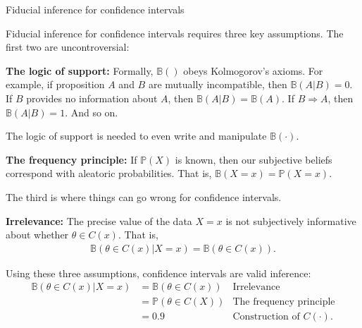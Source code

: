 \documentclass[8pt]{beamer}\usepackage[]{graphicx}\usepackage[]{color}
\def\p#1{\mathbb{P}\left(#1\right)}
\def\b#1{\mathbb{B}\left(#1\right)}
\begin{document}

\begin{frame}{Fiducial inference for confidence intervals}

Fiducial inference for confidence intervals requires three key assumptions.
The first two are uncontroversial:

\textbf{The logic of support:}  Formally, $\b{}$ obeys Kolmogorov's axioms. For
example, if proposition $A$ and $B$ are mutually incompatible, then $\b{A | B} =
0$.  If $B$ provides no information about $A$, then $\b{A | B} = \b{A}$.
If $B \Rightarrow A$, then $\b{A | B} = 1$.  And so on.

The logic of support is needed to even write and manipulate $\b{\cdot}$.

\pause

\textbf{The frequency principle:}  If $\p{X}$ is known, then our
subjective beliefs correspond with aleatoric probabilities.  That is,
$\b{X = x} = \p{X = x}$.

\pause

The third is where things can go wrong for confidence intervals.

\textbf{Irrelevance:} The precise value of the data $X=x$ is not  subjectively
informative about whether $\theta \in C(x)$.  That is,
%
\begin{align*}
%
\b{\theta \in C(x) | X = x} = \b{\theta \in C(x)}.
%
\end{align*}
%

\pause

Using these three assumptions, confidence
intervals are valid inference:
%
\begin{align*}
%
\b{\theta \in C(x) | X = x} &= \b{\theta \in C(x)}
    & \textrm{Irrelevance}\\
&= \p{\theta \in C(X)}
    & \textrm{The frequency principle}\\
&= 0.9
& \textrm{Construction of }C(\cdot).
%
\end{align*}
%
\end{frame}



\end{document}

